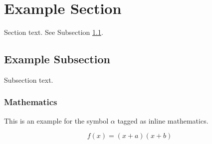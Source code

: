 \documentclass[preprint,12pt,authoryear]{elsarticle}
\begin{document}


\section{Example Section}
\label{sec1}

Section text. See Subsection \ref{subsec1}.

\subsection{Example Subsection}
\label{subsec1}

Subsection text.


\subsubsection{Mathematics}
This is an example for the symbol $\alpha$ tagged as inline mathematics.

\begin{equation}
f(x) = (x+a)(x+b)
\end{equation}
\end{document}
